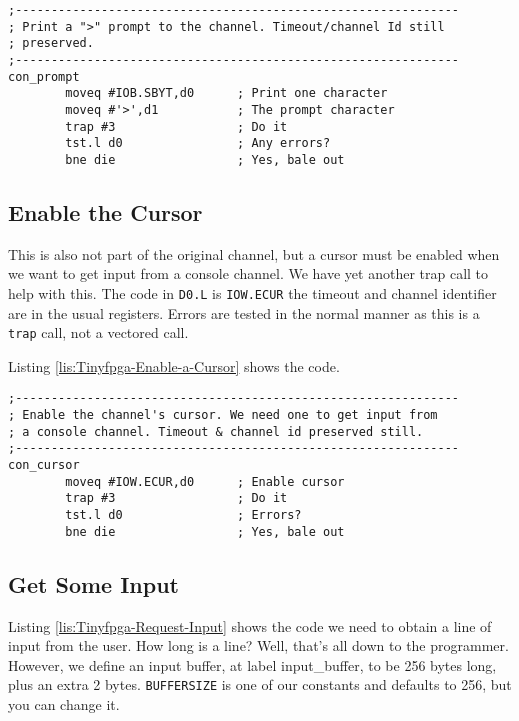 \begin{lstlisting}[caption={Tinyfpga - Print a Prompt},label={lis:Tinyfpga-Print-a-Prompt}]
;--------------------------------------------------------------
; Print a ">" prompt to the channel. Timeout/channel Id still
; preserved.
;--------------------------------------------------------------
con_prompt
        moveq #IOB.SBYT,d0      ; Print one character
        moveq #'>',d1           ; The prompt character
        trap #3                 ; Do it
        tst.l d0                ; Any errors?
        bne die                 ; Yes, bale out

\end{lstlisting}


\subsection{Enable the Cursor}

This is also not part of the original channel, but a cursor must be
enabled when we want to get input from a console channel. We have
yet another trap call to help with this. The code in \texttt{D0.L}
is \texttt{IOW.ECUR} the timeout and channel identifier are in the
usual registers. Errors are tested in the normal manner as this is
a \texttt{trap} call, not a vectored call.

Listing \ref{lis:Tinyfpga-Enable-a-Cursor} shows the code.

\begin{lstlisting}[caption={Tinyfpga - Enable a Cursor},label={lis:Tinyfpga-Enable-a-Cursor}]
;--------------------------------------------------------------
; Enable the channel's cursor. We need one to get input from
; a console channel. Timeout & channel id preserved still.
;--------------------------------------------------------------
con_cursor
        moveq #IOW.ECUR,d0      ; Enable cursor
        trap #3                 ; Do it
        tst.l d0                ; Errors?
        bne die                 ; Yes, bale out

\end{lstlisting}


\subsection{Get Some Input}

Listing \ref{lis:Tinyfpga-Request-Input} shows the code we need to
obtain a line of input from the user. How long is a line? Well, that's
all down to the programmer. However, we define an input buffer, at
label input\_buffer, to be 256 bytes long, plus an extra 2 bytes.
\texttt{BUFFERSIZE} is one of our constants and defaults to 256, but
you can change it.


